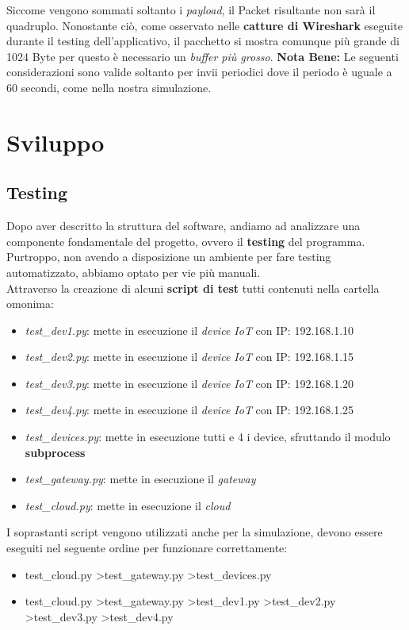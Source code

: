 \documentclass[a4paper,12pt]{report}
\begin{document}
Siccome vengono sommati soltanto i \emph{payload}, il Packet risultante non sarà il quadruplo. Nonostante ciò, come osservato nelle \textbf{catture di Wireshark} eseguite durante il testing dell'applicativo, il pacchetto si mostra comunque più grande di 1024 Byte per questo è necessario un \emph{buffer più grosso}.
\newline
\newline
\textbf{Nota Bene:} Le seguenti considerazioni sono valide soltanto per invii periodici dove il periodo è uguale a 60 secondi, come nella nostra simulazione.
\chapter{Sviluppo}
\section{Testing}
Dopo aver descritto la struttura del software, andiamo ad analizzare una componente fondamentale del progetto, ovvero il \textbf{testing} del programma.
Purtroppo, non avendo a disposizione un ambiente per fare testing automatizzato, abbiamo optato per vie più manuali.
\\
Attraverso la creazione di alcuni \textbf{script di test} tutti contenuti nella cartella omonima:
\begin{itemize}
    \item \emph{test\_dev1.py}: mette in esecuzione il \emph{device IoT} con IP: 192.168.1.10
    \item \emph{test\_dev2.py}: mette in esecuzione il \emph{device IoT} con IP: 192.168.1.15
    \item \emph{test\_dev3.py}: mette in esecuzione il \emph{device IoT} con IP: 192.168.1.20
    \item \emph{test\_dev4.py}: mette in esecuzione il \emph{device IoT} con IP:
    192.168.1.25
    \item \emph{test\_devices.py}: mette in esecuzione tutti e 4 i device, sfruttando il modulo \textbf{subprocess}
    \item \emph{test\_gateway.py}: mette in esecuzione il \emph{gateway}
    \item \emph{test\_cloud.py}: mette in esecuzione il \emph{cloud}
\end{itemize}

I soprastanti script vengono utilizzati anche per la simulazione, devono essere eseguiti nel seguente ordine per funzionare correttamente: 
\begin{itemize}
    \item test\_cloud.py \textgreater test\_gateway.py \textgreater test\_devices.py
    \item test\_cloud.py \textgreater test\_gateway.py \textgreater test\_dev1.py \textgreater test\_dev2.py \textgreater test\_dev3.py \textgreater test\_dev4.py 
\end{itemize}
\end{document}
